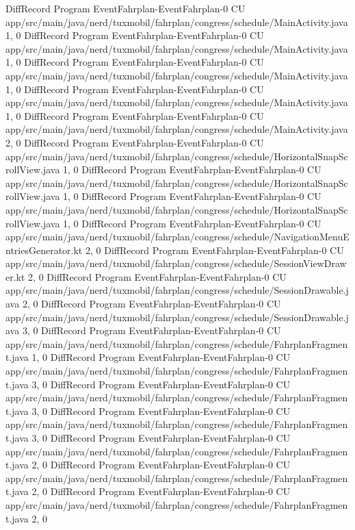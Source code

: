DiffRecord Program EventFahrplan-EventFahrplan-0 CU app/src/main/java/nerd/tuxmobil/fahrplan/congress/schedule/MainActivity.java  {1, 0}
DiffRecord Program EventFahrplan-EventFahrplan-0 CU app/src/main/java/nerd/tuxmobil/fahrplan/congress/schedule/MainActivity.java  {1, 0}
DiffRecord Program EventFahrplan-EventFahrplan-0 CU app/src/main/java/nerd/tuxmobil/fahrplan/congress/schedule/MainActivity.java  {1, 0}
DiffRecord Program EventFahrplan-EventFahrplan-0 CU app/src/main/java/nerd/tuxmobil/fahrplan/congress/schedule/MainActivity.java  {1, 0}
DiffRecord Program EventFahrplan-EventFahrplan-0 CU app/src/main/java/nerd/tuxmobil/fahrplan/congress/schedule/MainActivity.java  {2, 0}
DiffRecord Program EventFahrplan-EventFahrplan-0 CU app/src/main/java/nerd/tuxmobil/fahrplan/congress/schedule/HorizontalSnapScrollView.java  {1, 0}
DiffRecord Program EventFahrplan-EventFahrplan-0 CU app/src/main/java/nerd/tuxmobil/fahrplan/congress/schedule/HorizontalSnapScrollView.java  {1, 0}
DiffRecord Program EventFahrplan-EventFahrplan-0 CU app/src/main/java/nerd/tuxmobil/fahrplan/congress/schedule/HorizontalSnapScrollView.java  {1, 0}
DiffRecord Program EventFahrplan-EventFahrplan-0 CU app/src/main/java/nerd/tuxmobil/fahrplan/congress/schedule/NavigationMenuEntriesGenerator.kt  {2, 0}
DiffRecord Program EventFahrplan-EventFahrplan-0 CU app/src/main/java/nerd/tuxmobil/fahrplan/congress/schedule/SessionViewDrawer.kt  {2, 0}
DiffRecord Program EventFahrplan-EventFahrplan-0 CU app/src/main/java/nerd/tuxmobil/fahrplan/congress/schedule/SessionDrawable.java  {2, 0}
DiffRecord Program EventFahrplan-EventFahrplan-0 CU app/src/main/java/nerd/tuxmobil/fahrplan/congress/schedule/SessionDrawable.java  {3, 0}
DiffRecord Program EventFahrplan-EventFahrplan-0 CU app/src/main/java/nerd/tuxmobil/fahrplan/congress/schedule/FahrplanFragment.java  {1, 0}
DiffRecord Program EventFahrplan-EventFahrplan-0 CU app/src/main/java/nerd/tuxmobil/fahrplan/congress/schedule/FahrplanFragment.java  {3, 0}
DiffRecord Program EventFahrplan-EventFahrplan-0 CU app/src/main/java/nerd/tuxmobil/fahrplan/congress/schedule/FahrplanFragment.java  {3, 0}
DiffRecord Program EventFahrplan-EventFahrplan-0 CU app/src/main/java/nerd/tuxmobil/fahrplan/congress/schedule/FahrplanFragment.java  {3, 0}
DiffRecord Program EventFahrplan-EventFahrplan-0 CU app/src/main/java/nerd/tuxmobil/fahrplan/congress/schedule/FahrplanFragment.java  {2, 0}
DiffRecord Program EventFahrplan-EventFahrplan-0 CU app/src/main/java/nerd/tuxmobil/fahrplan/congress/schedule/FahrplanFragment.java  {2, 0}
DiffRecord Program EventFahrplan-EventFahrplan-0 CU app/src/main/java/nerd/tuxmobil/fahrplan/congress/schedule/FahrplanFragment.java  {2, 0}
